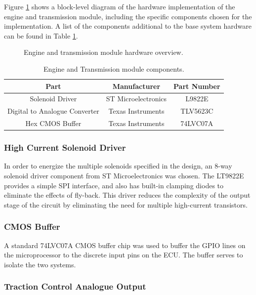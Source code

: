 Figure \ref{fig:engine_system_overview} shows a block-level diagram of the hardware implementation of the engine and transmission module, including the specific components chosen for the implementation. A list of the components additional to the base system hardware can be found in Table \ref{tab:engine_transmission_module_components}.

\begin{figure}[H]
\centering

\caption{Engine and transmission module hardware overview.}
\label{fig:engine_system_overview}
\end{figure}

\begin{table}[H]
  \caption{Engine and Transmission module components.\label{tab:engine_transmission_module_components}}
  \centering
  \begin{tabular}{|c|c|c|}
    \hline 
    Part & Manufacturer & Part Number\tabularnewline 
    \hline \hline
    Solenoid Driver & ST Microelectronics & L9822E \tabularnewline
    \hline
    Digital to Analogue Converter & Texas Instruments & TLV5623C \tabularnewline
    \hline
    Hex CMOS Buffer & Texas Instruments & 74LVC07A \tabularnewline
    \hline
  \end{tabular}
\end{table}

\subsubsection{High Current Solenoid Driver}

In order to energize the multiple solenoids specified in the design, an 8-way solenoid driver component from ST Microelectronics was chosen. The LT9822E provides a simple SPI interface, and also has built-in clamping diodes to eliminate the effects of fly-back. This driver reduces the complexity of the output stage of the circuit by eliminating the need for multiple high-current transistors.

\subsubsection{CMOS Buffer}

A standard 74LVC07A CMOS buffer chip was used to buffer the GPIO lines on the microprocessor to the discrete input pins on the ECU. The buffer serves to isolate the two systems. 

\subsubsection{Traction Control Analogue Output}

